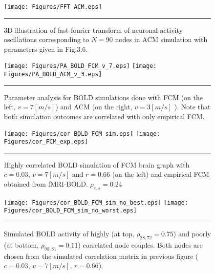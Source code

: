 \begin{figure}[htbp]
 
  \centering
	 \texttt{[image: Figures/FFT\_ACM.eps]} 

    \rule{35em}{0.5pt}
  \caption[3D Fourier Transform, FHN, ACM]{3D illustration of fast fourier transform of neuronal activity oscillations corresponding to $N=90$ nodes in ACM simulation with parameters given in Fig.3.6.} 
    \label{fig:3D Fourier Transform, FHN, ACM}
 	
\end{figure}  




\begin{figure}[htbp]
 
  \centering
    \texttt{[image: Figures/PA\_BOLD\_FCM\_v\_7.eps]} 
	\texttt{[image: Figures/PA\_BOLD\_ACM\_v\_3.eps]} 

	
    \rule{35em}{0.5pt}
  \caption[Parameter Analysis, BOLD]{Parameter analysis for BOLD simulations done with FCM (on the left, $v=7 [m/s]$) and ACM (on the right, $v=3 [m/s]$ ). Note that both simulation outcomes are correlated with only empirical FCM. }
  \label{fig:Parameter Analysis, BOLD}
 	
\end{figure} 



\begin{figure}[htbp]
 
  \centering
	 \texttt{[image: Figures/cor\_BOLD\_FCM\_sim.eps]} 
   	 \texttt{[image: Figures/cor\_FCM\_exp.eps]} 

    \rule{35em}{0.5pt}
  \caption[Best correlated BOLD simulation, FCM]{Highly correlated BOLD simulation of FCM brain graph with $c=0.03$, $v=7 [m/s]$ and $r=0.66$ (on the left) and empirical FCM obtained from fMRI-BOLD. $\rho_{e,s} = 0.24$} 
    \label{fig:Best correlated BOLD simulation, FCM}
 	
\end{figure}  





\begin{figure}[htbp]
 
  \centering
	 \texttt{[image: Figures/cor\_BOLD\_FCM\_sim\_no\_best.eps]} 
   	 \texttt{[image: Figures/cor\_BOLD\_FCM\_sim\_no\_worst.eps]} 

    \rule{35em}{0.5pt}
  \caption[BOLD Activity Node Dynamics, FCM]{Simulated BOLD activity of highly (at top, $\rho_{28,72}=0.75$) and poorly (at bottom, $\rho_{90,81}=0.11$) correlated node couples. Both nodes are chosen from the simulated correlation matrix in previous figure ($c=0.03$, $v=7 [m/s]$, $r=0.66$).} 
    \label{fig:BOLD Activity Node Dynamics, FCM}
 	
\end{figure} 



